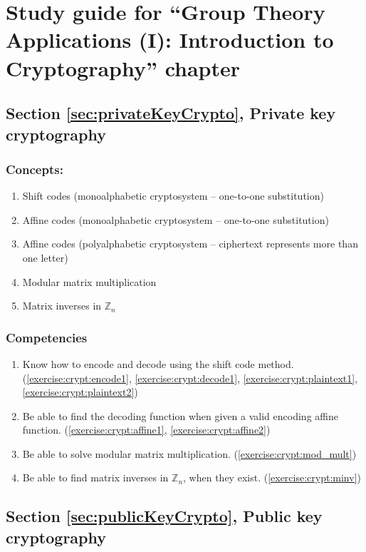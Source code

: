 \section{Study guide  for ``Group Theory Applications (I): Introduction to Cryptography''  chapter}
\label{sec:crypt:study} 
\subsection*{Section \ref{sec:privateKeyCrypto}, Private key cryptography}
\subsubsection*{Concepts:}
\begin{enumerate}
\item 
Shift codes (monoalphabetic cryptosystem -- one-to-one substitution)
\item
Affine codes (monoalphabetic cryptosystem -- one-to-one substitution)
\item
Affine codes (polyalphabetic cryptosystem -- ciphertext represents more than one letter)
\item
Modular matrix multiplication
\item
Matrix inverses in ${\mathbb Z}_{n}$
\end{enumerate}

\subsubsection*{Competencies}
\begin{enumerate}
\item
Know how to encode and decode using the shift code method.   (\ref{exercise:crypt:encode1}, \ref{exercise:crypt:decode1}, \ref{exercise:crypt:plaintext1}, \ref{exercise:crypt:plaintext2})
\item
Be able to find the decoding function when given a valid encoding affine function.  (\ref{exercise:crypt:affine1}, \ref{exercise:crypt:affine2})
\item
Be able to solve modular matrix multiplication.  (\ref{exercise:crypt:mod_mult})
\item
Be able to find matrix inverses in ${\mathbb Z}_{n}$, when they exist.  (\ref{exercise:crypt:minv})
\end{enumerate}


\subsection*{Section \ref{sec:publicKeyCrypto}, Public key cryptography}
